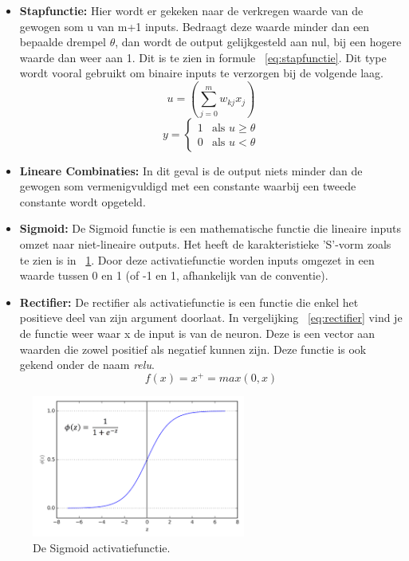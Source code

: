 			\begin{itemize}
				\item \textbf{Stapfunctie:} Hier wordt er gekeken naar de verkregen waarde van de gewogen som u van m+1 inputs. Bedraagt deze waarde minder dan een bepaalde drempel $\theta$, dan wordt de output gelijkgesteld aan nul, bij een hogere waarde dan weer aan 1. Dit is te zien in formule ~\ref{eq:stapfunctie}. Dit type wordt vooral gebruikt om binaire inputs te verzorgen bij de volgende laag. 
				\begin{equation}
				u =  \left( \sum_{j=0}^{m}w_{kj}x_j\right) 
				\end{equation}
				\begin{equation}\label{eq:stapfunctie}
				y={\begin{cases}1&{\text{als }}u\geq \theta
					\\0&{\text{als }}u<\theta \end{cases}}
				\end{equation}
				
				\item \textbf{Lineare Combinaties:} In dit geval is de output niets minder dan de gewogen som vermenigvuldigd met een constante waarbij een tweede constante wordt opgeteld.
				\item \textbf{Sigmoid:} De Sigmoid functie is een mathematische functie die lineaire inputs omzet naar niet-lineaire outputs. Het heeft de karakteristieke 'S'-vorm zoals te zien is in ~\ref{fig:sigmoid}. Door deze activatiefunctie worden inputs omgezet in een waarde tussen 0 en 1 (of -1 en 1, afhankelijk van de conventie).
				\item \textbf{Rectifier:} De rectifier als activatiefunctie is een functie die enkel het positieve deel van zijn argument doorlaat. In vergelijking ~\ref{eq:rectifier} vind je de functie weer waar x de input is van de neuron. Deze is een vector aan waarden die zowel positief als negatief kunnen zijn. Deze functie is ook gekend onder de naam \textit{\gls{relu}}.
				\begin{equation}\label{eq:rectifier}
				f(x) = x^+ = max(0,x)
				\end{equation}
			\end{itemize}
			
			\begin{figure}
				\centering
				\includegraphics[width=70mm]{afbeeldingen/sigmoid.PNG}
				\caption{De Sigmoid activatiefunctie\citep{bron:sigmoidfoto}.}
				\label{fig:sigmoid}
			\end{figure}

